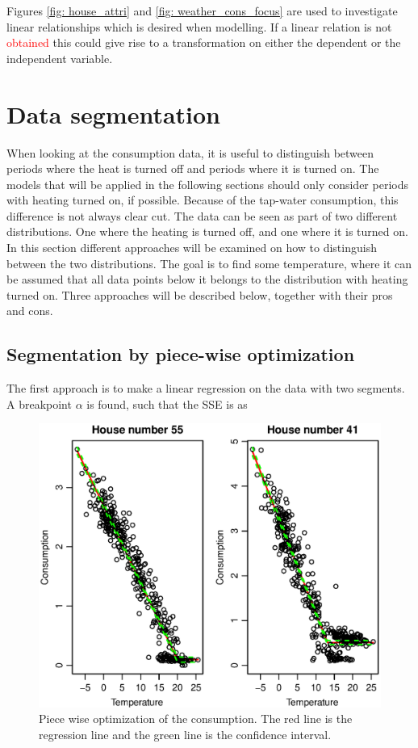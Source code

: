 Figures \ref{fig: house_attri} and \ref{fig: weather_cons_focus} are used to investigate linear relationships which is desired when modelling. If a linear relation is not \textcolor{red}{obtained} this could give rise to a transformation on either the dependent or the independent variable.  

\section{Data segmentation}
When looking at the consumption data, it is useful to distinguish between
periods where the heat is turned off and periods where it is turned on.
The models that will be applied in the following sections should only consider periods with heating turned on, if possible.
Because of the tap-water consumption, this difference is not always clear cut.
The data can be seen as part of two different distributions. One where the
heating is turned off, and one where it is turned on. In this section different 
approaches will be examined on how to distinguish between the two distributions.
The goal is to find some temperature, where it can be assumed that all data points below it
belongs to the distribution with heating turned on. Three approaches will be described below, together with their pros and cons.

\subsection*{Segmentation by piece-wise optimization}
The first approach is to make a linear regression on the data with two segments. A breakpoint $\alpha$ is found, such that the SSE is as 



\begin{figure}[H]
    \centering
    \includegraphics[width=\textwidth]{../../../figures/Consumption-PW.eps}
    \caption{Piece wise optimization of the consumption. The red line is the regression line and the green line is the confidence interval.}
    \label{fig: Consumption-PW}
\end{figure}
